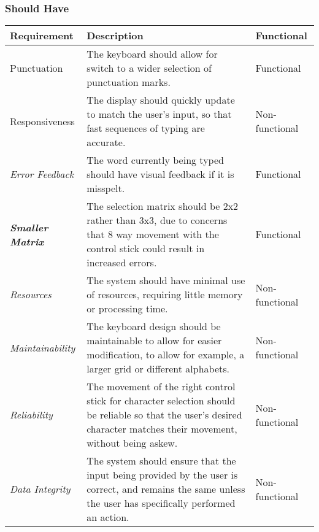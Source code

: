 \documentclass[requirements.tex]{subfiles}
\begin{document}
\subsubsection{Should Have} %
\label{ssub:after_should_have}
\begin{table}[H]
\small
\begin{tabularx}{\textwidth}{| l | X | l |}
 \hline
 \textbf{Requirement} & \textbf{Description} & \textbf{Functional} \\
 \hline
 Punctuation & The keyboard should allow for switch to a wider selection of
 punctuation marks. & Functional \\
 \hline
 Responsiveness & The display should quickly update to match the user's input,
 so that fast sequences of typing are accurate. & Non-functional \\
 \hline
 \emph{Error Feedback} & The word currently being typed should have visual
 feedback if it is misspelt. & Functional \\
 \hline
 \textbf{\emph{Smaller Matrix}} & The selection matrix should be 2x2 rather than
 3x3, due to concerns that 8 way movement with the control stick could result
 in increased errors. & Functional \\
 \hline
 \emph{Resources} & The system should have minimal use of resources, requiring
 little memory or processing time. & Non-functional \\
 \hline
 \emph{Maintainability} & The keyboard design should be maintainable to allow
 for easier modification, to allow for example, a larger grid or different
 alphabets. & Non-functional \\
 \hline
 \emph{Reliability} & The movement of the right control stick for character
 selection should be reliable so that the user's desired character matches their
 movement, without being askew. & Non-functional \\
 \hline
 \emph{Data Integrity} & The system should ensure that the input being provided
 by the user is correct, and remains the same unless the user has specifically
 performed an action. & Non-functional \\
 \hline
\end{tabularx}
\end{table}
\end{document}
